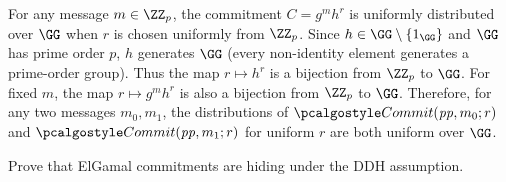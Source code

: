 \ifsolutions
\begin{mysolution}
  For any message $m \in \ZZ_p$, the commitment $C = g^m h^r$ is uniformly distributed over $\GG$ when $r$ is chosen uniformly from $\ZZ_p$.
  Since $h \in \GG \setminus \{1_\GG\}$ and $\GG$ has prime order $p$, $h$ generates $\GG$ (every non-identity element generates a prime-order group).
  Thus the map $r \mapsto h^r$ is a bijection from $\ZZ_p$ to $\GG$.
  For fixed $m$, the map $r \mapsto g^m h^r$ is also a bijection from $\ZZ_p$ to $\GG$.
  Therefore, for any two messages $m_0, m_1$, the distributions of $\algo{Commit}(\params, m_0; r)$ and $\algo{Commit}(\params, m_1; r)$ for uniform $r$ are both uniform over $\GG$.
\end{mysolution}
\fi

\begin{exercise}
  Prove that ElGamal commitments are hiding under the DDH assumption.
\end{exercise}

